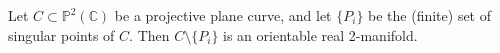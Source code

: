 Let $C \subset \mathbb{P}^2(\mathbb{C})$ be a projective plane curve, and let $\{P_i\}$ be the (finite) set of singular points of $C$. Then $C \setminus \{P_i\}$ is an orientable real 2-manifold.
